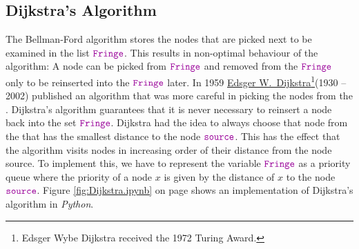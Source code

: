 \subsection{Dijkstra's Algorithm \label{sec:dijkstra}}
The Bellman-Ford algorithm stores the nodes that are picked next to be examined in the list $\mytt{Fringe}$.
This results in non-optimal behaviour of the algorithm:  A node can be picked from $\mytt{Fringe}$ and
removed from the $\mytt{Fringe}$ only to be reinserted into the $\mytt{Fringe}$ later.  In 1959
\href{https://en.wikipedia.org/wiki/Edsger_W._Dijkstra}{Edsger W.~Dijkstra}\footnote{
  Edsger Wybe Dijkstra received the 1972 Turing Award.}(1930 -- 2002) \cite{dijkstra:59}
published an algorithm that was more careful in picking the nodes from the .  Dijkstra's algorithm guarantees that it
is never necessary to reinsert a node back into the set $\mytt{Fringe}$.  Dijkstra had the idea to always choose
that node from the  that has the smallest distance to the node $\mytt{source}$.  This has the effect that the algorithm
visits nodes in increasing order of their distance from the node source.  
To implement this, we have to
represent the variable $\mytt{Fringe}$ as a priority queue where the priority of a node $x$ is given by the
distance of $x$ to the node $\mytt{source}$.  Figure \ref{fig:Dijkstra.ipynb} on page
\pageref{fig:Dijkstra.ipynb} shows an implementation of Dijkstra's algorithm 
in \textsl{Python}.


